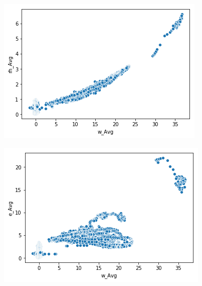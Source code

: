 \documentclass[11pt, spanish]{report}
\begin{document}
\begin{figure}
\centering
\begin{minipage}{.5\textwidth}
  \centering
  \includegraphics[width=\linewidth]{3.png}
  \label{fig:test1}
\end{minipage}%
\begin{minipage}{.5\textwidth}
  \centering
  \includegraphics[width=\linewidth]{4.png}
  \label{fig:test2}
\end{minipage}
\end{figure}
\end{document}
